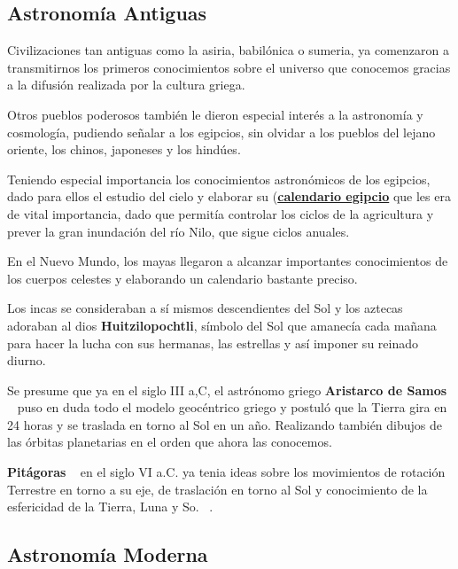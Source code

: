 \subsection{Astronomía Antiguas}

\bigskip
Civilizaciones tan antiguas como la asiria, babilónica o  sumeria, ya comenzaron a transmitirnos los primeros conocimientos sobre el universo que conocemos gracias a la difusión realizada por la cultura griega.

\bigskip
Otros pueblos poderosos también le dieron especial interés a la astronomía y cosmología, pudiendo señalar a los egipcios, sin olvidar a  los pueblos del lejano oriente, los chinos, japoneses y los hindúes.

\bigskip
Teniendo especial importancia los conocimientos astronómicos de los egipcios, dado para ellos el estudio del cielo y elaborar su 
(\href{https://es.wikipedia.org/wiki/Calendario_egipcio}{\textbf{calendario egipcio}} que les era de vital importancia, dado que permitía controlar los ciclos de la agricultura y prever la gran inundación del río Nilo, que sigue ciclos anuales.

\bigskip
En el Nuevo Mundo, los mayas llegaron a alcanzar importantes conocimientos de los cuerpos celestes y elaborando un calendario bastante preciso. 
\newline

\bigskip
Los incas se consideraban a sí mismos descendientes del Sol y los aztecas adoraban al dios \textbf{Huitzilopochtli}, símbolo del Sol
que amanecía cada mañana para hacer la lucha con sus hermanas, las estrellas y así imponer su reinado diurno.
\newline

\bigskip
Se presume que ya en el  siglo III a,C, el astrónomo griego \textbf{Aristarco de Samos} ~\cite{Arist} puso en duda todo el modelo geocéntrico griego y postuló que la Tierra gira en 24 horas y se traslada en torno al Sol en un año. Realizando también dibujos de las órbitas planetarias en el orden que ahora las conocemos.

\bigskip
\textbf{Pitágoras} ~\cite{Pitagoras} en el siglo VI  a.C. ya tenia ideas sobre los movimientos de rotación  Terrestre en torno a su eje, de traslación en torno al Sol y conocimiento de la esfericidad de la Tierra, Luna y So.  ~\cite{AstroAnti}.

\newpage

\subsection{Astronomía Moderna}

